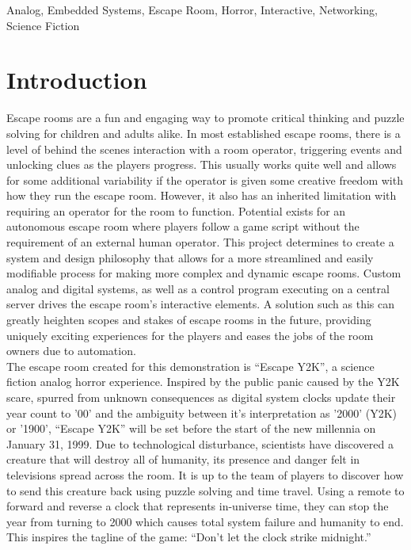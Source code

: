 \documentclass[conference]{IEEEtran}
\begin{document}
\begin{IEEEkeywords}
    Analog, Embedded Systems, Escape Room, Horror, Interactive, Networking, Science Fiction
\end{IEEEkeywords}

\section{Introduction}
Escape rooms are a fun and engaging way to promote critical thinking and puzzle solving for children and adults
alike. In most established escape rooms, there is a level of behind the scenes interaction with a room operator,
triggering events and unlocking clues as the players progress. This usually works quite well and allows for some
additional variability if the operator is given some creative freedom with how they run the escape room. However,
it also has an inherited limitation with requiring an operator for the room to function. Potential exists for an
autonomous escape room where players follow a game script without the requirement of an external human operator.
This project determines to create a system and design philosophy that allows for a more streamlined and easily modifiable
process for making more complex and dynamic escape rooms. Custom analog and digital systems, as well as a control program
executing on a central server drives the escape room's interactive elements. A solution such as this can greatly
heighten scopes and stakes of escape rooms in the future, providing uniquely exciting experiences for the players
and eases the jobs of the room owners due to automation.
\\
\indent The escape room created for this demonstration is ``Escape Y2K'', a science fiction analog horror experience. 
Inspired by the public panic caused by the Y2K scare, spurred from unknown consequences as digital system
clocks update their year count to '00' and the ambiguity between it's interpretation as '2000' (Y2K) or '1900',
``Escape Y2K'' will be set before the start of the new millennia on January 31, 1999. Due to technological disturbance,
scientists have discovered a creature that will destroy all of humanity, its presence and danger felt in televisions
spread across the room. It is up to the team of players to discover how to send this creature back using puzzle solving
and time travel. Using a remote to forward and reverse a clock that represents in-universe time, they can stop the year
from turning to 2000 which causes total system failure and humanity to end. This inspires the tagline of the game:
``Don't let the clock strike midnight.''
\end{document}
